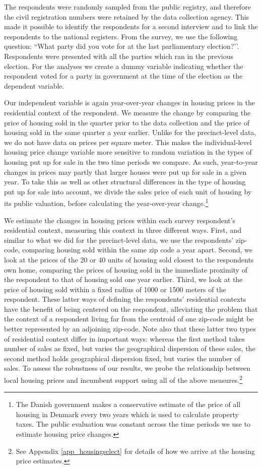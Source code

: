 \documentclass[12pt,a4paper]{article}
\begin{document}
	The respondents were randomly sampled from the public registry, and therefore the civil registration numbers were retained by the data collection agency. This made it possible to identify the respondents for a second interview and to link the respondents to the national registers. From the survey, we use the following question: ``What party did you vote for at the last parliamentary election?’’. Respondents were presented with all the parties which ran in the previous election. For the analyses we create a dummy variable indicating whether the respondent voted for a party in government at the time of the election as the dependent variable.
	
	
	Our independent variable is again year-over-year changes in housing prices in the residential context of the respondent. We measure the change by comparing the price of housing sold in the quarter prior to the data collection and the price of housing sold in the same quarter a year earlier. Unlike for the precinct-level data, we do not have data on prices per square meter. This makes the individual-level housing price change variable more sensitive to random variation in the types of housing put up for sale in the two time periods we compare. As such, year-to-year changes in prices may partly that larger houses were put up for sale in a given year. To take this as well as other structural differences in the type of housing put up for sale into account, we divide the sales price of each unit of housing by its public valuation, before calculating the year-over-year change.\footnote{The Danish government makes a conservative estimate of the price of all housing in Denmark every two years which is used to calculate property taxes. The public evaluation was constant across the time periods we use to estimate housing price changes.}
	
	We estimate the changes in housing prices within each survey respondent's residential context, measuring this context in three different ways. First, and similar to what we did for the precinct-level data, we use the respondents’ zip-code, comparing housing sold within the same zip code a year apart. Second, we look at the prices of the 20 or 40 units of housing sold closest to the respondents own home, comparing the prices of housing sold in the immediate proximity of the respondent to that of housing sold one year earlier. Third, we look at the price of housing sold within a fixed radius of 1000 or 1500 meters of the respondent. These latter ways of defining the respondents’ residential contexts have the benefit of being centered on the respondent, alleviating the problem that the context of a respondent living far from the centroid of one zip-code might be better represented by an adjoining zip-code. Note also that these latter two types of residential context differ in important ways: whereas the first method takes number of sales as fixed, but varies the geographical dispersion of these sales, the second method holds geographical dispersion fixed, but varies the number of sales. To assess the robustness of our results, we probe the relationship between local housing prices and incumbent support using all of the above measures.\footnote{See Appendix \ref{app_housingselect} for details of how we arrive at the housing price estimates.}
	
\end{document}
